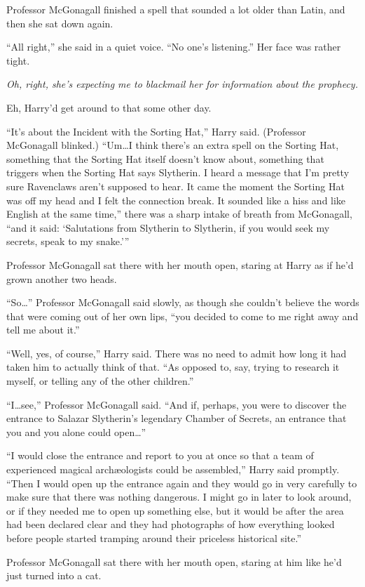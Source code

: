 Professor McGonagall finished a spell that sounded a lot older than Latin, and then she sat down again.

“All right,” she said in a quiet voice. “No one’s listening.” Her face was rather tight.

\emph{Oh, right, she’s expecting me to blackmail her for information about the prophecy.}

Eh, Harry’d get around to that some other day.

“It’s about the Incident with the Sorting Hat,” Harry said. (Professor McGonagall blinked.) “Um…I think there’s an extra spell on the Sorting Hat, something that the Sorting Hat itself doesn’t know about, something that triggers when the Sorting Hat says Slytherin. I heard a message that I’m pretty sure Ravenclaws aren’t supposed to hear. It came the moment the Sorting Hat was off my head and I felt the connection break. It sounded like a hiss and like English at the same time,” there was a sharp intake of breath from McGonagall, “and it said: ‘Salutations from Slytherin to Slytherin, if you would seek my secrets, speak to my snake.’”

Professor McGonagall sat there with her mouth open, staring at Harry as if he’d grown another two heads.

“So…” Professor McGonagall said slowly, as though she couldn’t believe the words that were coming out of her own lips, “you decided to come to me right away and tell me about it.”

“Well, yes, of course,” Harry said. There was no need to admit how long it had taken him to actually think of that. “As opposed to, say, trying to research it myself, or telling any of the other children.”

“I…see,” Professor McGonagall said. “And if, perhaps, you were to discover the entrance to Salazar Slytherin’s legendary Chamber of Secrets, an entrance that you and you alone could open…”

“I would close the entrance and report to you at once so that a team of experienced magical archæologists could be assembled,” Harry said promptly. “Then I would open up the entrance again and they would go in very carefully to make sure that there was nothing dangerous. I might go in later to look around, or if they needed me to open up something else, but it would be after the area had been declared clear and they had photographs of how everything looked before people started tramping around their priceless historical site.”

Professor McGonagall sat there with her mouth open, staring at him like he’d just turned into a cat.

